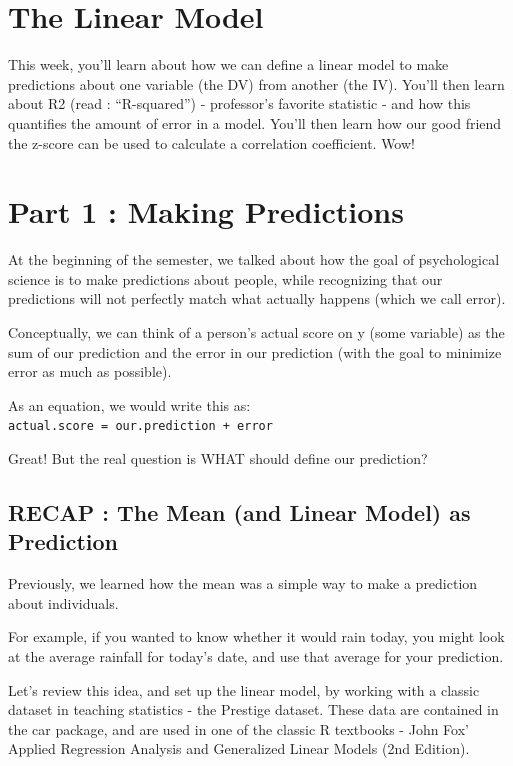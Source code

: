 \documentclass[
  letterpaper,
  DIV=11,
  numbers=noendperiod,
  oneside]{scrreprt}
\begin{document}
\chapter{The Linear Model}\label{the-linear-model}

This week, you'll learn about how we can define a linear model to make
predictions about one variable (the DV) from another (the IV). You'll
then learn about R2 (read : ``R-squared'') - professor's favorite
statistic - and how this quantifies the amount of error in a model.
You'll then learn how our good friend the z-score can be used to
calculate a correlation coefficient. Wow!

\chapter{Part 1 : Making Predictions}\label{part-1-making-predictions}

At the beginning of the semester, we talked about how the goal of
psychological science is to make predictions about people, while
recognizing that our predictions will not perfectly match what actually
happens (which we call error).

Conceptually, we can think of a person's actual score on y (some
variable) as the sum of our prediction and the error in our prediction
(with the goal to minimize error as much as possible).

As an equation, we would write this as:
\texttt{actual.score\ =\ our.prediction\ +\ error}

Great! But the real question is WHAT should define our prediction?

\section{RECAP : The Mean (and Linear Model) as
Prediction}\label{recap-the-mean-and-linear-model-as-prediction}

Previously, we learned how the mean was a simple way to make a
prediction about individuals.

For example, if you wanted to know whether it would rain today, you
might look at the average rainfall for today's date, and use that
average for your prediction.

Let's review this idea, and set up the linear model, by working with a
classic dataset in teaching statistics - the Prestige dataset. These
data are contained in the car package, and are used in one of the
classic R textbooks - John Fox' Applied Regression Analysis and
Generalized Linear Models (2nd Edition).
\end{document}
